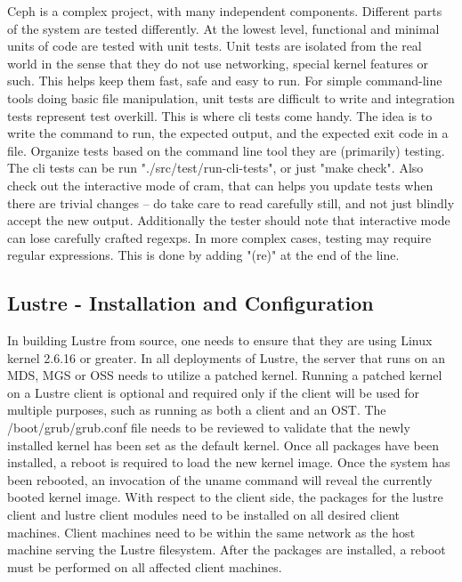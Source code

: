 \documentclass[11pt]{article}
\begin{document}
Ceph is a complex project, with many independent components. Different parts 
of the system are tested differently.  At the lowest level, functional and 
minimal units of code are tested with unit tests. Unit tests are isolated 
from the real world in the sense that they do not use networking, special 
kernel features or such. This helps keep them fast, safe and easy to run.  
For simple command-line tools doing basic file manipulation, unit tests are 
difficult to write and integration tests represent test overkill. This is 
where cli tests come handy. The idea is to write the command to run, the 
expected output, and the expected exit code in a file. Organize tests based 
on the command line tool they are (primarily) testing. The cli tests can be 
run "./src/test/run-cli-tests", or just "make check".  Also check out the 
interactive mode of cram, that can helps you update tests when there are 
trivial changes -- do take care to read carefully still, and not just 
blindly accept the new output.  Additionally the tester should note that 
interactive mode can lose carefully crafted regexps. In more complex cases, 
testing may require regular expressions. This is done by adding "(re)" at 
the end of the line.

\subsection{Lustre - Installation and Configuration}
In building Lustre from source, one needs to ensure that they are using 
Linux kernel 2.6.16 or greater. In all deployments of Lustre, the server 
that runs on an MDS, MGS or OSS needs to utilize a patched kernel. 
Running a patched kernel on a Lustre client is optional and required only 
if the client will be used for multiple purposes, such as running as both 
a client and an OST. The /boot/grub/grub.conf file needs to be reviewed 
to validate that the newly installed kernel has been set as the default 
kernel. Once all packages have been installed, a reboot is required to 
load the new kernel image. Once the system has been rebooted, an invocation 
of the uname command will reveal the currently booted kernel image. With 
respect to the client side, the packages for the lustre client and lustre 
client modules need to be installed on all desired client machines. Client 
machines need to be within the same network as the host machine serving the 
Lustre filesystem. After the packages are installed, a reboot must be 
performed on all affected client machines.
\end{document}
